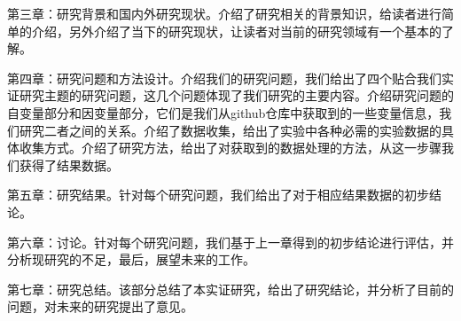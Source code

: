 第三章：研究背景和国内外研究现状。介绍了研究相关的背景知识，给读者进行简单的介绍，另外介绍了当下的研究现状，让读者对当前的研究领域有一个基本的了解。

第四章：研究问题和方法设计。介绍我们的研究问题，我们给出了四个贴合我们实证研究主题的研究问题，这几个问题体现了我们研究的主要内容。介绍研究问题的自变量部分和因变量部分，它们是我们从github仓库中获取到的一些变量信息，我们研究二者之间的关系。介绍了数据收集，给出了实验中各种必需的实验数据的具体收集方式。介绍了研究方法，给出了对获取到的数据处理的方法，从这一步骤我们获得了结果数据。

第五章：研究结果。针对每个研究问题，我们给出了对于相应结果数据的初步结论。

第六章：讨论。针对每个研究问题，我们基于上一章得到的初步结论进行评估，并分析现研究的不足，最后，展望未来的工作。

第七章：研究总结。该部分总结了本实证研究，给出了研究结论，并分析了目前的问题，对未来的研究提出了意见。

